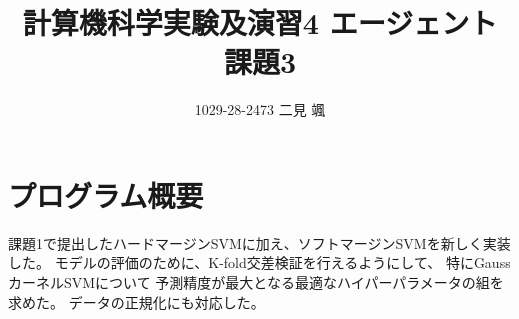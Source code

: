 \documentclass{jsarticle}
\begin{document}
\title{計算機科学実験及演習4 エージェント 課題3}
\author{1029-28-2473 二見 颯}
\maketitle

\section{プログラム概要}
課題1で提出したハードマージンSVMに加え、ソフトマージンSVMを新しく実装した。
モデルの評価のために、K-fold交差検証を行えるようにして、
特にGaussカーネルSVMについて
予測精度が最大となる最適なハイパーパラメータの組を求めた。
データの正規化にも対応した。
\end{document}
